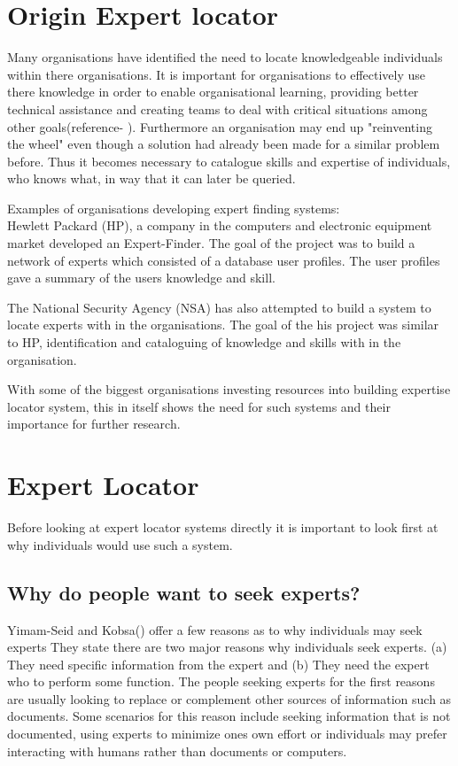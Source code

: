 \documentclass[a4paper,oneside,11pt]{report}
\begin{document}
\section{Origin Expert locator}
Many organisations have identified the need to locate knowledgeable individuals within there organisations. It is important for organisations to effectively use there knowledge in order to enable organisational learning, providing better technical assistance and creating teams to deal with critical situations among other goals(reference- ). Furthermore an organisation may end up "reinventing the wheel" even though a solution had already been made for a similar problem before. Thus it becomes necessary to catalogue skills and expertise of individuals, who knows what,  in way that it can later be queried\autocite{fernandez2000}.

Examples of organisations developing expert finding systems: \\
Hewlett Packard (HP), a company in the computers and electronic equipment market developed  an Expert-Finder. The goal of the project was to build a network of experts which consisted of a database user profiles. The user profiles gave a summary of the users knowledge and skill\autocite{fernandez2000}.
 
The National Security Agency (NSA) has also attempted to build a system to locate experts with in the organisations. The goal of the his project was similar to HP, identification and cataloguing of knowledge and skills with in the organisation\autocite{fernandez2000}.


With some of the biggest organisations investing resources into building expertise locator system, this in itself shows the need for such systems and their importance for further research. 

\section{Expert Locator}
Before looking at expert locator systems directly it is important to look first at why individuals would use such a system.
\subsection{Why do people want to seek experts?}
Yimam-Seid and Kobsa(\citeyear{kobsaseid2003}) offer a few reasons as to why individuals may seek experts They state there are two major reasons why individuals seek experts. (a) They need specific information from the expert and (b) They need the expert who to perform some function. The people seeking experts for the first reasons are usually looking to replace or complement other sources of information such as documents. Some scenarios for this reason include seeking information that is not documented, using experts to minimize ones own effort or individuals may prefer interacting with humans rather than documents or computers. 
\end{document}
